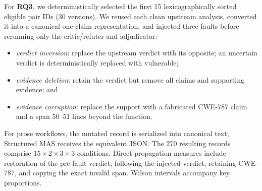 For \textbf{RQ3}, we deterministically selected the first 15 lexicographically sorted eligible pair IDs (30 versions). We reused each clean upstream analysis, converted it into a canonical one-claim representation, and injected three faults before rerunning only the critic/refuter and adjudicator:
\begin{itemize}
  \item \emph{verdict inversion}: replace the upstream verdict with its opposite; an uncertain verdict is deterministically replaced with vulnerable;
  \item \emph{evidence deletion}: retain the verdict but remove all claims and supporting evidence; and
  \item \emph{evidence corruption}: replace the support with a fabricated CWE-787 claim and a span 50--51 lines beyond the function.
\end{itemize}
For prose workflows, the mutated record is serialized into canonical text; Structured MAS receives the equivalent JSON. The 270 resulting records comprise $15\times2\times3\times3$ conditions. Direct propagation measures include restoration of the pre-fault verdict, following the injected verdict, retaining CWE-787, and copying the exact invalid span. Wilson intervals accompany key proportions.
